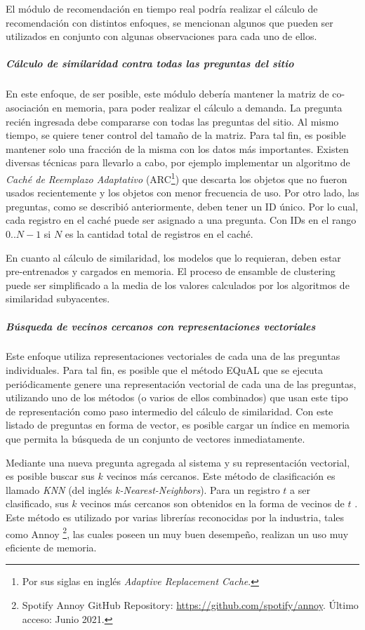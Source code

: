 \bigskip El módulo de recomendación en tiempo real podría realizar el cálculo de recomendación con distintos enfoques, se mencionan algunos que pueden ser utilizados en conjunto con algunas observaciones para cada uno de ellos.

\subparagraph{Cálculo de similaridad contra todas las preguntas del sitio}
En este enfoque, de ser posible, este módulo debería mantener la matriz de co-asociación en memoria, para poder realizar el cálculo a demanda. La pregunta recién ingresada debe compararse con todas las preguntas del sitio. Al mismo tiempo, se quiere tener control del tamaño de la matriz. Para tal fin, es posible mantener solo una fracción de la misma con los datos más importantes. Existen diversas técnicas para llevarlo a cabo, por ejemplo implementar un algoritmo de \textit{Caché de Reemplazo Adaptativo }(ARC\footnote{Por sus siglas en inglés \textit{Adaptive Replacement Cache}.}) que descarta los objetos que no fueron usados recientemente y los objetos con menor frecuencia de uso. Por otro lado, las preguntas, como se describió anteriormente, deben tener un ID único. Por lo cual, cada registro en el caché puede ser asignado a una pregunta. Con IDs en el rango \(0.. N-1\) si \(N\) es la cantidad total de registros en el caché.

\bigskip En cuanto al cálculo de similaridad, los modelos que lo requieran, deben estar pre-entrenados y cargados en memoria. El proceso de ensamble de clustering puede ser simplificado a la media de los valores calculados por los algoritmos de similaridad subyacentes.

\subparagraph{Búsqueda de vecinos cercanos con representaciones vectoriales}
Este enfoque utiliza representaciones vectoriales de cada una de las preguntas individuales. Para tal fin, es posible que el método EQuAL que se ejecuta periódicamente genere una representación vectorial de cada una de las preguntas, utilizando uno de los métodos (o varios de ellos combinados) que usan este tipo de representación como paso intermedio del cálculo de similaridad. Con este listado de preguntas en forma de vector, es posible cargar un índice en memoria que permita la búsqueda de un conjunto de vectores inmediatamente.

\bigskip Mediante una nueva pregunta agregada al sistema y su representación vectorial, es posible buscar sus \(k\) vecinos más cercanos. Este método de clasificación es llamado \textit{KNN} (del inglés \textit{k-Nearest-Neighbors}). Para un registro \(t\) a ser clasificado, sus \(k\) vecinos más cercanos son obtenidos en la forma de vecinos de \(t\) \citep{guo2003knn}. Este método es utilizado por varias librerías reconocidas por la industria, tales como Annoy \footnote{Spotify Annoy GitHub Repository: \url{https://github.com/spotify/annoy}. Último acceso: Junio 2021.}, las cuales poseen un muy buen desempeño, realizan un uso muy eficiente de memoria.

